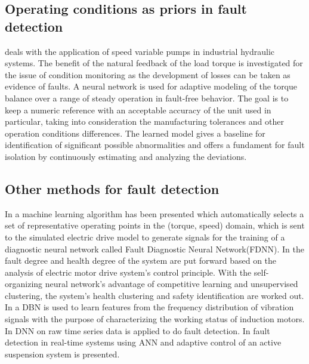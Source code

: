 \documentclass[conference]{IEEEtran}
\begin{document}
\subsection{\textbf{Operating conditions as priors in fault detection}}

\cite{alicmotor} deals with the application of speed variable pumps in industrial hydraulic systems. The benefit of the natural feedback of the load torque is investigated for the issue of condition monitoring as the development of losses can be taken as evidence of faults. A neural network is used for adaptive modeling of the torque balance over a range of steady operation in fault-free behavior. The goal is to keep a numeric reference with an acceptable accuracy of the unit used in particular, taking into consideration the manufacturing tolerances and other operation conditions differences. The learned model gives a baseline for identification of significant possible abnormalities and offers a fundament for fault isolation by continuously estimating and analyzing the deviations.

\subsection{\textbf{Other methods for fault detection}}

In \cite{murphey2006fault, murphey2006model} a machine learning algorithm has been presented which automatically selects a set of representative operating points in the (torque, speed) domain, which is sent to the simulated electric drive model to generate signals for the training of a diagnostic neural network called Fault Diagnostic Neural Network(FDNN). In \cite{meng2016safety} the fault degree and health degree of the system are put forward based on the analysis of electric motor drive system’s control principle. With the self-organizing neural network’s advantage of competitive learning and unsupervised clustering, the system’s health clustering and safety identification are worked out. In \cite{Shao2017} a DBN is used to learn features from the frequency distribution of vibration signals with the purpose of characterizing the working status of induction motors. In \cite{zhang2017fault} DNN on raw time series data is applied to do fault detection. In \cite{marko1991nips} fault detection in real-time systems using ANN and adaptive control of an active suspension system is presented.




\end{document}
